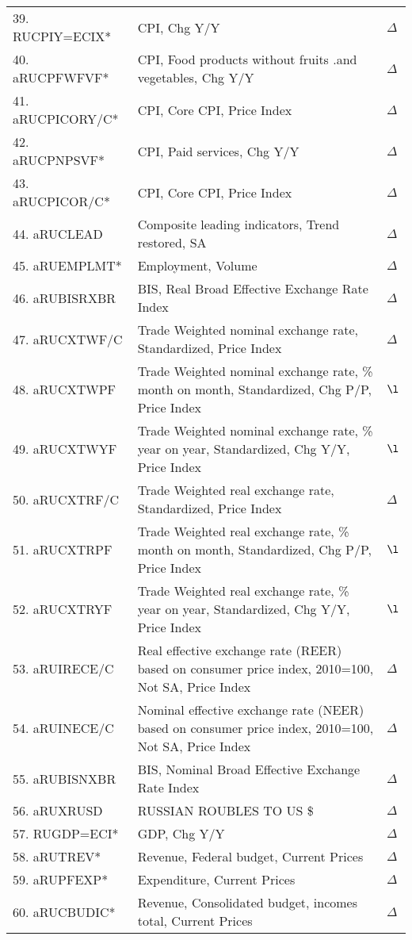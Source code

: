 \documentclass[a4paper, 14pt]{article}
\begin{document}
\begin{center}
\begin{longtable}{p{5.5cm} p{10cm} p{0.15cm}}
	39. RUCPIY=ECIX* &  CPI, Chg Y/Y & $\Delta$\\
	40. aRUCPFWFVF* &  CPI, Food products without fruits .and vegetables, Chg Y/Y & $\Delta$\\
	41. aRUCPICORY/C* &  CPI, Core CPI, Price Index & $\Delta$\\
	42. aRUCPNPSVF* &  CPI, Paid services, Chg Y/Y & $\Delta$\\
	43. aRUCPICOR/C* &  CPI, Core CPI, Price Index & $\Delta$\\
	44. aRUCLEAD &  Composite leading indicators, Trend restored, SA & $\Delta$\\
	45. aRUEMPLMT* &  Employment, Volume & $\Delta$\\
	46. aRUBISRXBR &  BIS, Real Broad Effective Exchange Rate Index & $\Delta$\\
	47. aRUCXTWF/C &  Trade Weighted nominal exchange rate, Standardized, Price Index & $\Delta$\\
	48. aRUCXTWPF &  Trade Weighted nominal exchange rate, \% month on month, Standardized, Chg P/P, Price Index & $\l$\\
	49. aRUCXTWYF &  Trade Weighted nominal exchange rate, \% year on year, Standardized, Chg Y/Y, Price Index & $\l$\\
	50. aRUCXTRF/C &  Trade Weighted real exchange rate, Standardized, Price Index & $\Delta$\\
	51. aRUCXTRPF &  Trade Weighted real exchange rate, \% month on month, Standardized, Chg P/P, Price Index & $\l$\\
	52. aRUCXTRYF &  Trade Weighted real exchange rate, \% year on year, Standardized, Chg Y/Y, Price Index & $\l$\\
	53. aRUIRECE/C &  Real effective exchange rate (REER) based on consumer price index, 2010=100, Not SA, Price Index & $\Delta$\\
	54. aRUINECE/C &  Nominal effective exchange rate (NEER) based on consumer price index, 2010=100, Not SA, Price Index & $\Delta$\\
	55. aRUBISNXBR &  BIS, Nominal Broad Effective Exchange Rate Index & $\Delta$\\
	56. aRUXRUSD &  RUSSIAN ROUBLES TO US \$ & $\Delta$\\
	57. RUGDP=ECI* &  GDP, Chg Y/Y & $\Delta$\\
	58. aRUTREV* &  Revenue, Federal budget, Current Prices & $\Delta$\\
	59. aRUPFEXP* &  Expenditure, Current Prices & $\Delta$\\
	60. aRUCBUDIC* &  Revenue, Consolidated budget, incomes total, Current Prices & $\Delta$\\

\end{longtable}
\end{center}
\end{document}

